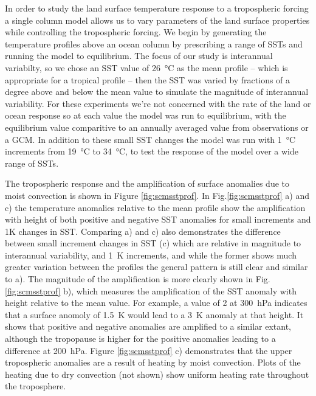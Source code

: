 In order to study the land surface temperature response to a tropospheric 
forcing a single column model allows us to vary parameters of the land surface 
properties while controlling the tropospheric forcing.  We begin by generating 
the temperature profiles above an ocean column by prescribing a range of SSTs 
and running the model to equilibrium.  The focus of our study is interannual 
variabilty, so we chose an SST value of \SI{26}{\degreeCelsius} as the mean 
profile -- which is appropriate for a tropical profile -- then the SST was 
varied by fractions of a degree above and below the mean value to simulate the 
magnitude of interannual variability. For these experiments we're not concerned 
with the rate of the land or ocean response so at each value the model was run 
to equilibrium, with the equilibrium value comparitive to an annually averaged 
value from observations or a GCM.  In addition to these small SST changes the 
model was run with \SI{1}{\degreeCelsius} increments from 
\SI{19}{\degreeCelsius} to \SI{34}{\degreeCelsius}, to test the response of the 
model over a wide range of SSTs.

The tropospheric response and the amplification of surface anomalies due to 
moist convection is shown in Figure \ref{fig:scmsstprof}.  In 
Fig.\ref{fig:scmsstprof} a) and c) the temperature anomalies relative to the 
mean profile show the amplification with height of both positive and negative 
SST anomalies for small increments and 1K changes in SST. Comparing a) and c) 
also demonstrates the difference between small increment changes in SST (c) 
which are relative in magnitude to interannual variability, and \SI{1}{\kelvin} 
increments, and while the former shows much greater variation between the 
profiles the general pattern is still clear and similar to a).  The magnitude of 
the amplification is more clearly shown in Fig.\ref{fig:scmsstprof} b), which 
measures the amplification of the SST anomaly with height relative to the mean 
value.  For example, a value of 2 at \SI{300}{\hecto\pascal} indicates that a 
surface anomoly of \SI{1.5}{\kelvin} would lead to a \SI{3}{\kelvin} anomaly at 
that height.  It shows that positive and negative anomalies are amplified to a 
similar extant, although the tropopause is higher for the positive anomalies 
leading to a difference at \SI{200}{\hecto\pascal}.  Figure \ref{fig:scmsstprof} 
c) demonstrates that the upper tropospheric anomalies are a result of heating by 
moist convection. Plots of the heating due to dry convection (not shown) show 
uniform heating rate throughout the troposphere.


